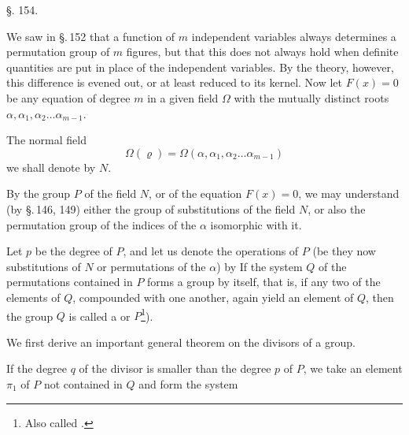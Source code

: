 \begin{center}
\S. 154.\\[4pt]
\end{center}

We saw in \S.\,152 that a function of $m$ independent variables always determines a permutation group of $m$ figures, but that this does not always hold when definite quantities are put in place of the independent variables. By the  theory, however, this difference is evened out, or at least reduced to its kernel. Now let $F(x) = 0$ be any equation of degree $m$ in a given field $\Omega$ with the mutually distinct roots $\alpha, \alpha_1, \alpha_2 \ldots \alpha_{m-1}$.

The normal field
\[
\Omega(\varrho) = \Omega(\alpha, \alpha_1, \alpha_2 \ldots \alpha_{m-1})
\]
we shall denote by $N$.

By the  group $P$ of the field $N$, or of the equation $F(x) = 0$, we may understand (by \S.\,146, 149) either the group of substitutions of the field $N$, or also the permutation group of the indices of the $\alpha$ isomorphic with it.

Let $p$ be the degree of $P$, and let us denote the operations of $P$ (be they now substitutions of $N$ or permutations of the $\alpha$) by
If the system $Q$ of the permutations contained in $P$
forms a group by itself, that is, if any two of the elements of $Q$, compounded with one another, again yield an element of $Q$, then the group $Q$ is called a  or  $P$\footnote{Also called .}).

We first derive an important general theorem on the divisors of a group.

If the degree $q$ of the divisor is smaller than the degree $p$ of $P$, we take an element $\pi_1$ of $P$ not contained in $Q$ and form the system
